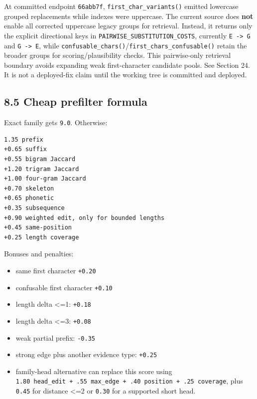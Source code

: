 At committed endpoint \texttt{66abb7f}, \texttt{first\_\allowbreak{}char\_\allowbreak{}variants()} emitted lowercase grouped replacements while indexes were uppercase. The current source does \textbf{not} enable all corrected uppercase legacy groups for retrieval. Instead, it returns only the explicit directional keys in \texttt{PAIRWISE\_\allowbreak{}SUBSTITUTION\_\allowbreak{}COSTS}, currently \texttt{E\ -\textgreater{}\ G} and \texttt{G\ -\textgreater{}\ E}, while \texttt{confusable\_\allowbreak{}chars()}/\texttt{first\_\allowbreak{}chars\_\allowbreak{}confusable()} retain the broader groups for scoring/plausibility checks. This pairwise-only retrieval boundary avoids expanding weak first-character candidate pools. See Section 24. It is not a deployed-fix claim until the working tree is committed and deployed.

\subsection{8.5 Cheap prefilter formula}\label{85-cheap-prefilter-formula}

Exact family gets \texttt{9.0}. Otherwise:

\begin{verbatim}
1.35 prefix
+0.65 suffix
+0.55 bigram Jaccard
+1.20 trigram Jaccard
+1.00 four-gram Jaccard
+0.70 skeleton
+0.65 phonetic
+0.35 subsequence
+0.90 weighted edit, only for bounded lengths
+0.45 same-position
+0.25 length coverage
\end{verbatim}

Bonuses and penalties:

\begin{itemize}
\tightlist
\item
  same first character \texttt{+0.20}
\item
  confusable first character \texttt{+0.10}
\item
  length delta \textless=1: \texttt{+0.18}
\item
  length delta \textless=3: \texttt{+0.08}
\item
  weak partial prefix: \texttt{-0.35}
\item
  strong edge plus another evidence type: \texttt{+0.25}
\item
  family-head alternative can replace this score using \texttt{1.80\ head\_\allowbreak{}edit\ +\ .55\ max\_\allowbreak{}edge\ +\ .40\ position\ +\ .25\ coverage}, plus \texttt{0.45} for distance \textless=2 or \texttt{0.30} for a supported short head.
\end{itemize}

